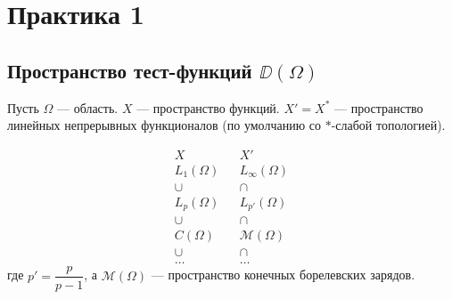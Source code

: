 \documentclass[12pt,a4paper]{article}
\begin{document}


\tableofcontents

\newpage


\section{Практика 1}
\renewcommand{\notesheader}{Математическая физика \(\cdot\) Практика 1 \(\cdot\) 04.09}

\subsection{Пространство тест-функций \texorpdfstring{$\DD(\Omega)$}{D(Omega)}}

Пусть \(\Omega\) --- область. \(X\) --- пространство функций.
\(X' = X^*\) --- пространство линейных непрерывных функционалов
(по умолчанию со \(*\)-слабой топологией).

\[
\begin{array}{ccc}
X & & X' \\[4pt]
L_1(\Omega) & & L_\infty(\Omega) \\
\cup & & \cap \\
L_p(\Omega) & & L_{p'}(\Omega) \\
\cup & & \cap \\
C(\Omega) & & \mathcal{M}(\Omega) \\
\cup & & \cap \\
\dots & & \ldots
\end{array}
\]
где \(p' = \dfrac{p}{p-1}\), а \(\mathcal{M}(\Omega)\) --- пространство
конечных борелевских зарядов.




\end{document}
